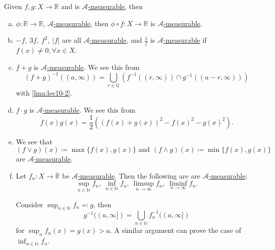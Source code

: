 \begin{remark}\label{rmk:Operations-preserve-measurability}
	Given \(f, g\colon X\to \mathbb{R} \) and is \hyperref[def:A-measurable-function]{\(\mathcal{A}\)-measurable}, then
	\begin{enumerate}[(a)]
		\item \(\phi \colon \mathbb{R} \to \mathbb{R} \), \hyperref[def:A-measurable-function]{\(\mathcal{A}\)-measurable}, then \(\phi \circ f\colon X \to \mathbb{R}\) is \hyperref[def:A-measurable-function]{\(\mathcal{A}\)-measurable}.
		\item \(-f,\ 3f,\ f^2,\ \left\vert f \right\vert \) are all \hyperref[def:A-measurable-function]{\(\mathcal{A} \)-measurable}, and \(\frac{1}{f}\) is \hyperref[def:A-measurable-function]{\(\mathcal{A}\)-measurable} if \(f(x)\neq 0, \forall x\in X\).
		\item \(f+g\) is \hyperref[def:A-measurable-function]{\(\mathcal{A}\)-measurable}. We see this from
		      \[
			      (f+g)^{-1} ((a, \infty ))=\bigcup_{r\in\mathbb{Q}} \left(f^{-1} ((r, \infty ))\cap g^{-1} ((a-r, \infty ))\right)
		      \]
		      with \autoref{lma:lec10-2}.
		\item \(f\cdot g\) is \hyperref[def:A-measurable-function]{\(\mathcal{A}\)-measurable}. We see this from
		      \[
			      f(x)g(x) = \frac{1}{2}\left((f(x)+g(x))^2 - f(x)^2 - g(x)^2\right).
		      \]
		\item We see that
		      \[
			      (f\vee g)(x)\coloneqq \max \{f(x), g(x)\}\text{ and }(f\wedge g)(x)\coloneqq \min\{f(x), g(x)\}
		      \]
		      are \hyperref[def:A-measurable-function]{\(\mathcal{A}\)-measurable}.
		\item Let \(f_{n}\colon X\to \overline{\mathbb{R} }\) be \hyperref[def:A-measurable-function]{\(\mathcal{A}\)-measurable}. Then the following are are \hyperref[def:A-measurable-function]{\(\mathcal{A}\)-measurable}:
		      \[
			      \sup_{n\in\mathbb{N} } f_{n},\ \inf_{n\in\mathbb{N} } f_{n},\ \limsup_{n\to \infty} f_{n},\ \liminf_{n\to \infty} f_{n}.
		      \]
		      \begin{explanation}
			      Consider \(\sup_{n\in\mathbb{N} } f_{n} \eqqcolon g\), then
			      \[
				      g^{-1} ((a, \infty ]) = \bigcup_{n\in\mathbb{N}} f_{n}^{-1} ((a, \infty ])
			      \]
			      for \(\sup_n f_{n}(x) = g(x)>a\). A similar argument can prove the case of \(\inf_{n\in\mathbb{N} } f_{n}\).


\end{explanation}
\end{enumerate}
\end{remark}
